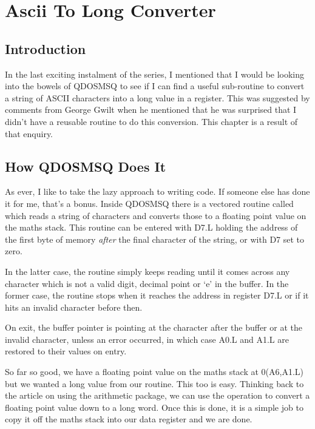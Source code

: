 \chapter{Ascii To Long Converter}

\section{Introduction}
\label{ch18-intro}%

In the last exciting instalment of the series, I mentioned that I would be looking
into the bowels of QDOSMSQ to see if I can find a useful sub-{}routine to convert a string
of ASCII characters into a long value in a register. This was suggested by comments from
George Gwilt when he mentioned that he was surprised that I didn't have a reusable routine
to do this conversion. This chapter is a result of that enquiry.

\section{How QDOSMSQ Does It}
\label{ch18-conversion}%

As ever, I like to take the lazy approach to writing code. If someone else has
done it for me, that's a bonus. Inside QDOSMSQ there is a vectored routine
called  which reads a string of characters and converts those to a
floating point value on the maths stack. This routine can be entered with D7.L
holding the address of the first byte of memory \emph{after} the final character of
the string, or with D7 set to zero.

In the latter case, the  routine simply keeps reading until it comes
across any character which is not a valid digit, decimal point or `e' in the
buffer. In the former case, the routine stops when it reaches the address in
register D7.L or if it hits an invalid character before then.

On exit, the buffer pointer is pointing at the character after the buffer or at
the invalid character, unless an error occurred, in which case A0.L and A1.L are
restored to their values on entry.

So far so good, we have a floating point value on the maths stack at 0(A6,A1.L)
but we wanted a long value from our routine. This too is easy. Thinking back to
the article on using the arithmetic package, we can use the  operation
to convert a floating point value down to a long word. Once this is done, it is
a simple job to copy it off the maths stack into our data register and we are
done.

